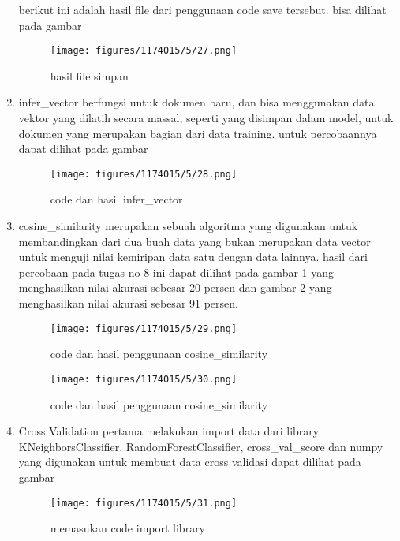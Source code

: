 \begin{enumerate}
        berikut ini adalah hasil file dari penggunaan code save tersebut. bisa dilihat pada gambar
        \begin{figure}[H]
            \texttt{[image: figures/1174015/5/27.png]}
            \centering
            \caption{hasil file simpan}
        \end{figure}
        
        \item infer\_vector
        \subitem berfungsi untuk dokumen baru, dan  bisa menggunakan data vektor yang dilatih secara massal, seperti yang disimpan dalam model, untuk dokumen yang merupakan bagian dari data training. untuk percobaannya dapat dilihat pada gambar
        \begin{figure}[H]
            \texttt{[image: figures/1174015/5/28.png]}
            \centering
            \caption{code dan hasil infer\_vector}
        \end{figure}
        
        \item cosine\_similarity
        \subitem merupakan sebuah algoritma yang digunakan untuk membandingkan dari dua buah data yang bukan merupakan data vector untuk menguji nilai kemiripan data satu dengan data lainnya. hasil dari percobaan pada tugas no 8 ini dapat dilihat pada gambar \ref{l10} yang menghasilkan nilai akurasi sebesar 20 persen dan gambar \ref{l11} yang menghasilkan nilai akurasi sebesar 91 persen.
        \begin{figure}[H]
            \texttt{[image: figures/1174015/5/29.png]}
            \centering
            \caption{code dan hasil penggunaan cosine\_similarity}
            \label{l10}
        \end{figure}
        
        \begin{figure}[H]
            \texttt{[image: figures/1174015/5/30.png]}
            \centering
            \caption{code dan hasil penggunaan cosine\_similarity}
            \label{l11}
        \end{figure}
        
        \item Cross Validation
        \subitem pertama melakukan import data dari library KNeighborsClassifier, RandomForestClassifier, cross\_val\_score dan numpy yang digunakan untuk membuat data cross validasi dapat dilihat pada gambar
        \begin{figure}[H]
            \texttt{[image: figures/1174015/5/31.png]}
            \centering
            \caption{memasukan code import library}
        \end{figure}
        

\end{enumerate}

